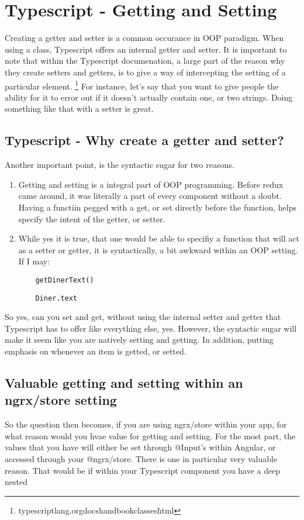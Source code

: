 \maketitle{}
\section{ Typescript - Getting and Setting  }
Creating a getter and setter is a common occurance in OOP paradigm. When using
a class, Typescript offers an internal getter and setter. It is important to
note that within the Typescript documenation, a large part of the reason why
they create setters and getters, is to give a way of intercepting the setting
of a particular element. \footnote{typescriptlang.org\/docs\/handbook\/classes\.html}
For instance, let's say that you want to give people the ability for it to
error out if it doesn't actually contain one, or two strings. Doing something
like that with a setter is great.

\subsection{ Typescript - Why create a getter and setter? }
Another important point, is the syntactic sugar for two reasons.
\begin{enumerate}
  \item Getting and setting is a integral part of OOP programming. Before redux
  came around, it was literally a part of every component without a doubt.
  Having a functiin pegged with a get, or set directly before the function, helps
  specify the intent of the getter, or setter.
  \item While yes it is true, that one would be able to specifiy a function that
  will act as a setter or getter, it is syntactically, a bit awkward within an
  OOP setting. If I may:
  \begin{verbatim}
    getDinerText()
  \end{verbatim}

  \begin{verbatim}
    Diner.text
  \end{verbatim}
\end{enumerate}

So yes, can you set and get, without using the internal setter and getter that
Typescript has to offer like everything else, yes. However, the syntactic sugar
will make it seem like you are natively setting and getting. In addition,
putting emphasis on whenever an item is getted, or setted.

\subsection{ Valuable getting and setting within an ngrx/store setting }
So the question then becomes, if you are using ngrx/store within your app, for
what reason would you hvae value for getting and setting. For the most part, the
values that you have will either be set through @Input's within Angular, or
accessed through your @ngrx/store. There is one in particular very valuable
reason. That would be if within your Typescript component you have a deep nested 
